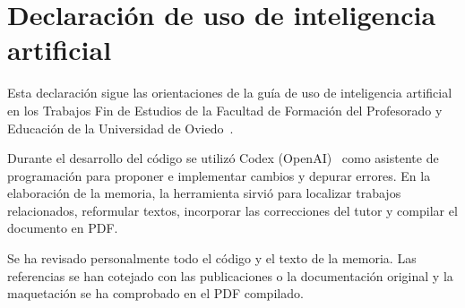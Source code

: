 \chapter{Declaración de uso de inteligencia artificial}
\label{app:uso_ia}

Esta declaración sigue las orientaciones de la guía de uso de inteligencia artificial en los Trabajos Fin de Estudios de la Facultad de Formación del Profesorado y Educación de la Universidad de Oviedo~\cite{uniovi2026guiatfe}.

Durante el desarrollo del código se utilizó Codex (OpenAI)~\cite{openaicodex} como asistente de programación para proponer e implementar cambios y depurar errores. En la elaboración de la memoria, la herramienta sirvió para localizar trabajos relacionados, reformular textos, incorporar las correcciones del tutor y compilar el documento en PDF.

Se ha revisado personalmente todo el código y el texto de la memoria. Las referencias se han cotejado con las publicaciones o la documentación original y la maquetación se ha comprobado en el PDF compilado.
